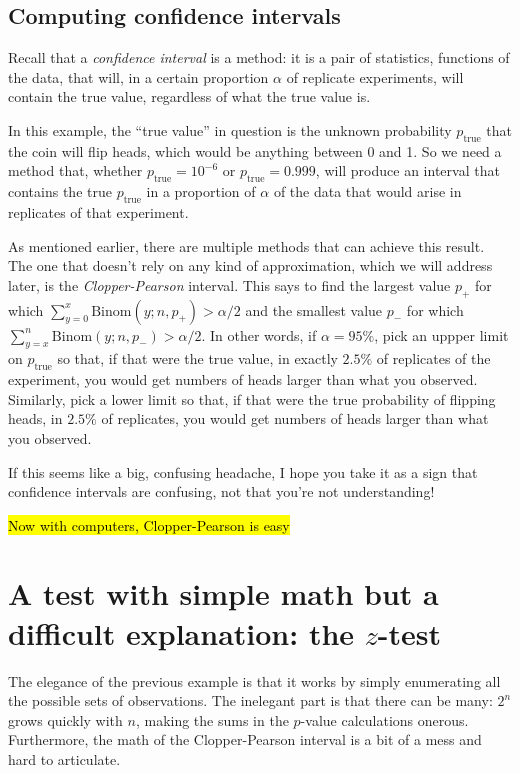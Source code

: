 \subsection{Computing confidence intervals}

Recall that a \emph{confidence interval} is a method: it is a pair of
statistics, functions of the data, that will, in a certain proportion $\alpha$
of replicate experiments, will contain the true value, regardless of what the
true value is.

In this example, the ``true value'' in question is the unknown probability
$p_\mathrm{true}$ that the coin will flip heads, which would be anything
between 0 and 1.  So we need a method that, whether $p_\mathrm{true} = 10^{-6}$
or $p_\mathrm{true} = 0.999$, will produce an interval that contains the true
$p_\mathrm{true}$ in a proportion of $\alpha$ of the data that would arise in
replicates of that experiment.

As mentioned earlier, there are multiple methods that can achieve this result.
The one that doesn't rely on any kind of approximation, which we will address
later, is the \emph{Clopper-Pearson} interval. This says to find the largest
value $p_+$ for which $\sum_{y=0}^x \mathrm{Binom}(y; n, p_+) > \alpha/2$ and
the smallest value $p_-$ for which $\sum_{y=x}^n \mathrm{Binom}(y; n, p_-) >
\alpha/2$. In other words, if $\alpha=95\%$, pick an uppper limit on
$p_\mathrm{true}$ so that, if that were the true value, in exactly $2.5\%$ of
replicates of the experiment, you would get numbers of heads larger than what
you observed. Similarly, pick a lower limit so that, if that were the true
probability of flipping heads, in $2.5\%$ of replicates, you would get numbers
of heads larger than what you observed.

If this seems like a big, confusing headache, I hope you take it as a sign that
confidence intervals are confusing, not that you're not understanding!

\hl{Now with computers, Clopper-Pearson is easy}

\section{A test with simple math but a difficult explanation: the $z$-test}

The elegance of the previous example is that it works by simply enumerating all
the possible sets of observations. The inelegant part is that there can be
many: $2^n$ grows quickly with $n$, making the sums in the $p$-value
calculations onerous. Furthermore, the math of the Clopper-Pearson interval is
a bit of a mess and hard to articulate.

